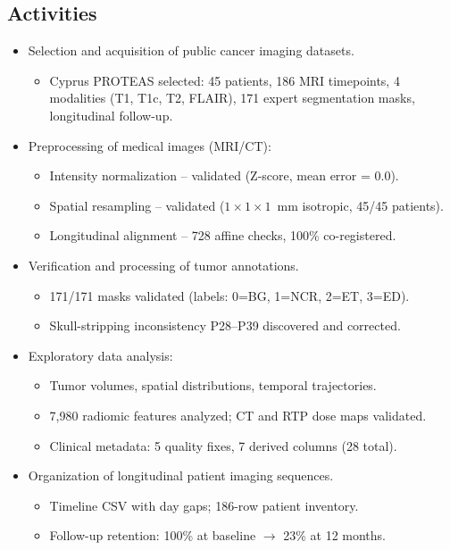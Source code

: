 \documentclass[10pt,a4paper]{article}
\begin{document}
\subsection*{Activities}
\begin{itemize}[nosep, leftmargin=1.5em]
    \item Selection and acquisition of public cancer imaging datasets.
    \begin{itemize}[nosep, leftmargin=1em]
        \item Cyprus PROTEAS selected: 45 patients, 186 MRI timepoints, 4 modalities (T1, T1c, T2, FLAIR), 171 expert segmentation masks, longitudinal follow-up.
    \end{itemize}
    \item Preprocessing of medical images (MRI/CT):
    \begin{itemize}[nosep, leftmargin=1em]
        \item Intensity normalization -- validated (Z-score, mean error = 0.0).
        \item Spatial resampling -- validated ($1\times1\times1$~mm isotropic, 45/45 patients).
        \item Longitudinal alignment -- 728 affine checks, 100\% co-registered.
    \end{itemize}
    \item Verification and processing of tumor annotations.
    \begin{itemize}[nosep, leftmargin=1em]
        \item 171/171 masks validated (labels: 0=BG, 1=NCR, 2=ET, 3=ED).
        \item Skull-stripping inconsistency P28--P39 discovered and corrected.
    \end{itemize}
    \item Exploratory data analysis:
    \begin{itemize}[nosep, leftmargin=1em]
        \item Tumor volumes, spatial distributions, temporal trajectories.
        \item 7,980 radiomic features analyzed; CT and RTP dose maps validated.
        \item Clinical metadata: 5 quality fixes, 7 derived columns (28 total).
    \end{itemize}
    \item Organization of longitudinal patient imaging sequences.
    \begin{itemize}[nosep, leftmargin=1em]
        \item Timeline CSV with day gaps; 186-row patient inventory.
        \item Follow-up retention: 100\% at baseline $\rightarrow$ 23\% at 12 months.
    \end{itemize}
\end{itemize}
\end{document}
